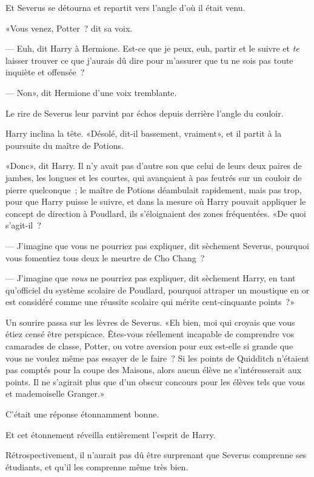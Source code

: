 Et Severus se détourna et repartit vers l'angle d'où il était venu.

«Vous venez, Potter~? dit sa voix.

--- Euh, dit Harry à Hermione. Est-ce que je peux, euh, partir et le suivre et \emph{te} laisser trouver ce que j'aurais dû dire pour m'assurer que tu ne sois pas toute inquiète et offensée~?

--- Non», dit Hermione d'une voix tremblante.

Le rire de Severus leur parvint par échos depuis derrière l'angle du couloir.

Harry inclina la tête. «Désolé, dit-il bassement, vraiment», et il partit à la poursuite du maître de Potions.

\later

«Donc», dit Harry. Il n'y avait pas d'autre son que celui de leurs deux paires de jambes, les longues et les courtes, qui avançaient à pas feutrés sur un couloir de pierre quelconque~; le maître de Potions déambulait rapidement, mais pas trop, pour que Harry puisse le suivre, et dans la mesure où Harry pouvait appliquer le concept de direction à Poudlard, ils s'éloignaient des zones fréquentées. «De quoi s'agit-il~?

--- J'imagine que vous ne pourriez pas expliquer, dit sèchement Severus, pourquoi vous fomentiez tous deux le meurtre de Cho Chang~?

--- J'imagine que \emph{vous} ne pourriez pas expliquer, dit sèchement Harry, en tant qu'officiel du système scolaire de Poudlard, pourquoi attraper un moustique en or est considéré comme une réussite scolaire qui mérite cent-cinquante points~?»

Un sourire passa sur les lèvres de Severus. «Eh bien, moi qui croyais que vous étiez censé être perspicace. Êtes-vous réellement incapable de comprendre vos camarades de classe, Potter, ou votre aversion pour eux est-elle si grande que vous ne voulez même pas essayer de le faire~? Si les points de Quidditch n'étaient pas comptés pour la coupe des Maisons, alors aucun élève ne s'intéresserait aux points. Il ne s'agirait plus que d'un obscur concours pour les élèves tels que vous et mademoiselle Granger.»

C'était une réponse étonnamment bonne.

Et cet étonnement réveilla entièrement l'esprit de Harry.

Rétrospectivement, il n'aurait pas dû être surprenant que Severus comprenne ses étudiants, et qu'il les comprenne même très bien.

